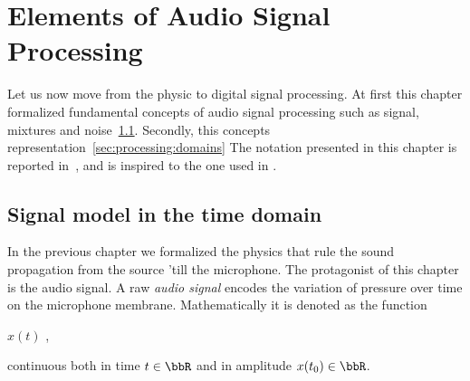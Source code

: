 \chapter{Elements of Audio Signal Processing}\label{ch:processing}
\vspace{-2.5em}
 Let us now move from the physic to digital signal processing.
At first this chapter formalized fundamental concepts of audio signal processing such as signal, mixtures and noise~\cref{sec:processing:model}.
Secondly, this concepts representation~\cref{sec:processing:domains}
The notation presented in this chapter is reported in~, and is inspired to the one used in .


\section{Signal model in the time domain}\label{sec:processing:model}
In the previous chapter we formalized the physics that rule the sound propagation from the source 'till the microphone.
The protagonist of this chapter is the audio signal.
A raw \textit{audio signal} encodes the variation of pressure over time on the microphone membrane.
Mathematically it is denoted as the function
\begin{center}
    $x(t)$
    ,
\end{center}
continuous both in time $t \in \R$ and in amplitude $x(t_0) \in \R$.

